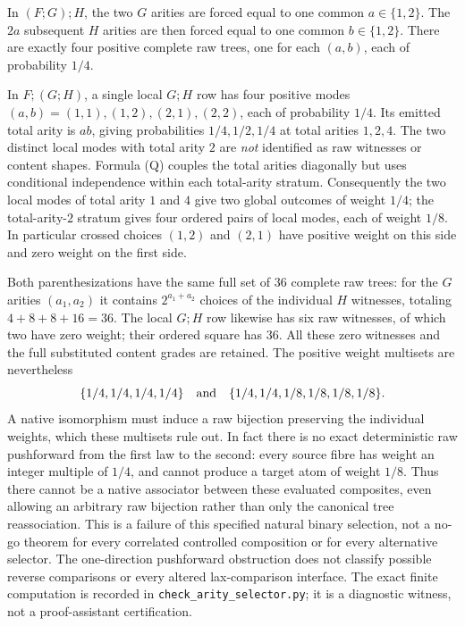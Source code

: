\documentclass{article}
\begin{document}
In $(F;G);H$, the two $G$ arities are forced equal to one common
$a\in\{1,2\}$. The $2a$ subsequent $H$ arities are then forced equal to
one common $b\in\{1,2\}$. There are exactly four positive complete raw trees,
one for each $(a,b)$, each of probability $1/4$.

In $F;(G;H)$, a single local $G;H$ row has four positive modes
$(a,b)=(1,1),(1,2),(2,1),(2,2)$, each of probability $1/4$.
Its emitted total arity is $ab$, giving probabilities $1/4,1/2,1/4$
at total arities $1,2,4$. The two distinct local modes with total arity $2$
are \emph{not} identified as raw witnesses or content shapes.
Formula (Q) couples the total arities diagonally but uses conditional
independence within each total-arity stratum. Consequently the two local
modes of total arity $1$ and $4$ give two global outcomes of weight $1/4$;
the total-arity-$2$ stratum gives four ordered pairs of local modes, each of
weight $1/8$. In particular crossed choices $(1,2)$ and $(2,1)$ have positive
weight on this side and zero weight on the first side.

Both parenthesizations have the same full set of $36$ complete raw trees:
for the $G$ arities $(a_1,a_2)$ it contains $2^{a_1+a_2}$ choices of the
individual $H$ witnesses, totaling $4+8+8+16=36$. The local $G;H$ row likewise
has six raw witnesses, of which two have zero weight; their ordered square
has $36$. All these zero witnesses and the full substituted content grades
are retained. The positive weight multisets are nevertheless
\[
 \{1/4,1/4,1/4,1/4\}
 \quad\hbox{and}\quad
 \{1/4,1/4,1/8,1/8,1/8,1/8\}.
\]
A native isomorphism must induce a raw bijection preserving the individual
weights, which these multisets rule out. In fact there is no exact deterministic raw pushforward from the first
law to the second: every source fibre has weight an integer multiple of
$1/4$, and cannot produce a target atom of weight $1/8$. Thus there cannot
be a native associator between these evaluated composites, even allowing
an arbitrary raw bijection rather than only the canonical tree reassociation. This is a
failure of this specified natural binary selection, not a no-go theorem for
every correlated controlled composition or for every alternative selector.
The one-direction pushforward obstruction does not classify possible reverse
comparisons or every altered lax-comparison interface.
The exact finite computation is recorded in \texttt{check\_arity\_selector.py};
it is a diagnostic witness, not a proof-assistant certification.
\end{document}
